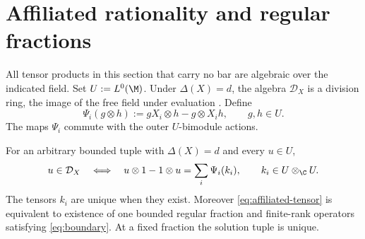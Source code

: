 \section{Affiliated rationality and regular fractions}\label{sec:fractions}
All tensor products in this section that carry no bar are algebraic over the indicated field.
Set $U:=L^0(\M)$.
Under $\Delta(X)=d$, the algebra $\mathcal D_X$ is a division ring, the image of the free field under evaluation \cite[Theorem~1.1]{MSY23}.
Define
\[
 \Psi_i(g\otimes h):=gX_i\otimes h-g\otimes X_ih,
 \qquad g,h\in U.
\]
The maps $\Psi_i$ commute with the outer $U$-bimodule actions.

\begin{proposition}\label{prop:intrinsic}
For an arbitrary bounded tuple with $\Delta(X)=d$ and every $u\in U$,
\begin{equation}\label{eq:affiliated-tensor}
 u\in\mathcal D_X
 \quad\Longleftrightarrow\quad
 u\otimes1-1\otimes u=\sum_i\Psi_i(k_i),\qquad k_i\in U\otimes_\C U.
\end{equation}
The tensors $k_i$ are unique when they exist.
Moreover \eqref{eq:affiliated-tensor} is equivalent to existence of one bounded regular fraction and finite-rank operators satisfying \eqref{eq:boundary}.
At a fixed fraction the solution tuple is unique.
\end{proposition}
